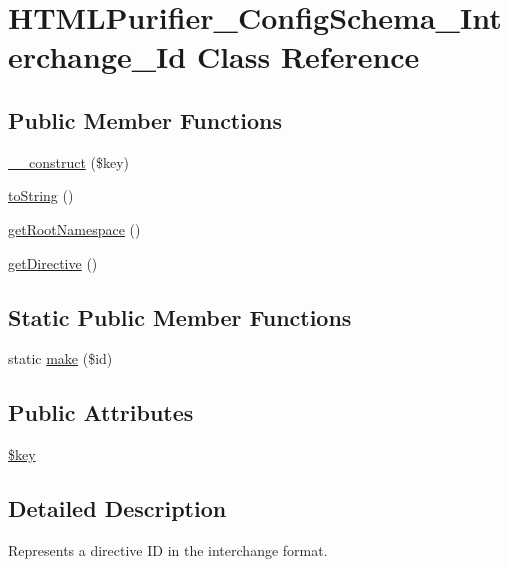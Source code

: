 \hypertarget{classHTMLPurifier__ConfigSchema__Interchange__Id}{\section{H\+T\+M\+L\+Purifier\+\_\+\+Config\+Schema\+\_\+\+Interchange\+\_\+\+Id Class Reference}
\label{classHTMLPurifier__ConfigSchema__Interchange__Id}
}
\subsection*{Public Member Functions}
\begin{DoxyCompactItemize}
\item 
\hyperlink{classHTMLPurifier__ConfigSchema__Interchange__Id_a35b9d78a9e71bae0534b66fd307615b9}{\+\_\+\+\_\+construct} (\$key)
\item 
\hyperlink{classHTMLPurifier__ConfigSchema__Interchange__Id_a2ffe1675508d336a851463c52605ef88}{to\+String} ()
\item 
\hyperlink{classHTMLPurifier__ConfigSchema__Interchange__Id_a0fd40073a958c8ffd197fad867b7fe46}{get\+Root\+Namespace} ()
\item 
\hyperlink{classHTMLPurifier__ConfigSchema__Interchange__Id_af421d984d6cf73e7acea9379ba9cbf21}{get\+Directive} ()
\end{DoxyCompactItemize}
\subsection*{Static Public Member Functions}
\begin{DoxyCompactItemize}
\item 
static \hyperlink{classHTMLPurifier__ConfigSchema__Interchange__Id_a5c8d85633626ad739878026d477015cc}{make} (\$id)
\end{DoxyCompactItemize}
\subsection*{Public Attributes}
\begin{DoxyCompactItemize}
\item 
\hyperlink{classHTMLPurifier__ConfigSchema__Interchange__Id_a8d3e83f6e8ecb121f0fbc7c640aaefec}{\$key}
\end{DoxyCompactItemize}


\subsection{Detailed Description}
Represents a directive I\+D in the interchange format. 

